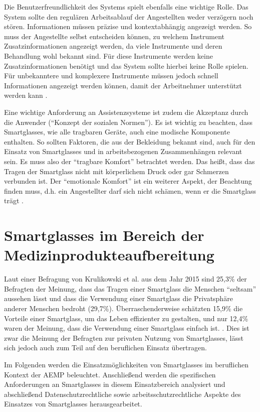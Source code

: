 Die Benutzerfreundlichkeit des Systems spielt ebenfalls eine wichtige Rolle. Das System sollte den regulären Arbeitsablauf der Angestellten weder verzögern noch stören. Informationen müssen präzise und kontextabhängig angezeigt werden. So muss der Angestellte selbst entscheiden können, zu welchem Instrument Zusatzinformationen angezeigt werden, da viele Instrumente und deren Behandlung wohl bekannt sind. Für diese Instrumente werden keine Zusatzinformationen benötigt und das System sollte hierbei keine Rolle spielen. Für unbekanntere und komplexere Instrumente müssen jedoch schnell Informationen angezeigt werden können, damit der Arbeitnehmer unterstützt werden kann \cite[S.~29]{Ruther2014}.

Eine wichtige Anforderung an Assistenzsysteme ist zudem die Akzeptanz durch die Anwender (\enquote{Konzept der sozialen Normen}). Es ist wichtig zu beachten, dass Smartglasses, wie alle tragbaren Geräte, auch eine modische Komponente enthalten. So sollten Faktoren, die aus der Bekleidung bekannt sind, auch für den Einsatz von Smartglasses und in arbeitsbezogenen Zusammenhängen relevant sein. Es muss also der \enquote{tragbare Komfort} betrachtet werden. Das heißt, dass das Tragen der Smartglass nicht mit körperlichem Druck oder gar Schmerzen verbunden ist.  Der \enquote{emotionale Komfort} ist ein weiterer Aspekt, der Beachtung finden muss, d.h. ein Angestellter darf sich nicht schämen, wenn er die Smartglass trägt \cite{Hein2016}.
%
%
%
%
%
%
\section{Smartglasses im Bereich der Medizinprodukteaufbereitung}
\label{sec:Smartglasses_im_Bereich_der_Medizinprodukteaufbereitung}
Laut einer Befragung von Krulikowski et al. aus dem Jahr 2015 \cite{Hein2016} sind 25,3\% der Befragten der Meinung, dass das Tragen einer Smartglass die Menschen \enquote{seltsam} aussehen lässt und dass die Verwendung einer Smartglass die Privatsphäre anderer Menschen bedroht (29,7\%). Überraschenderweise schätzten 15,9\% die Vorteile einer Smartglass, um das Leben effizienter zu gestalten, und nur 12,4\% waren der Meinung, dass die Verwendung einer Smartglass einfach ist. \cite{Hein2016}. Dies ist zwar die Meinung der Befragten zur privaten Nutzung von Smartglasses, lässt sich jedoch auch zum Teil auf den beruflichen Einsatz übertragen.

Im Folgenden werden die Einsatzmöglichkeiten von Smartglasses im beruflichen Kontext der AEMP beleuchtet. Anschließend werden die spezifischen Anforderungen an Smartglasses in diesem Einsatzbereich analysiert und abschließend Datenschutzrechtliche sowie arbeitsschutzrechtliche Aspekte des Einsatzes von Smartglasses herausgearbeitet. 
%
%
%
%
%
%
%
